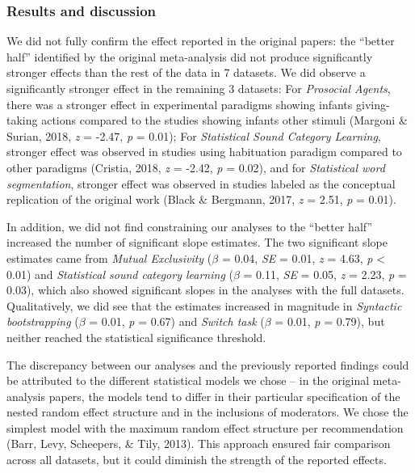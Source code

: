 \documentclass[
  man]{apa6}
\begin{document}
\hypertarget{results-and-discussion-2}{%
\subsubsection{Results and discussion}\label{results-and-discussion-2}}

We did not fully confirm the effect reported in the original papers: the ``better half'' identified by the original meta-analysis did not produce significantly stronger effects than the rest of the data in 7 datasets. We did observe a significantly stronger effect in the remaining 3 datasets: For \emph{Prosocial Agents}, there was a stronger effect in experimental paradigms showing infants giving-taking actions compared to the studies showing infants other stimuli (Margoni \& Surian, 2018, \emph{z} = -2.47, \emph{p} = 0.01); For \emph{Statistical Sound Category Learning}, stronger effect was observed in studies using habituation paradigm compared to other paradigms (Cristia, 2018, \emph{z} = -2.42, \emph{p} = 0.02), and for \emph{Statistical word segmentation}, stronger effect was observed in studies labeled as the conceptual replication of the original work (Black \& Bergmann, 2017, \emph{z} = 2.51, \emph{p} = 0.01).

In addition, we did not find constraining our analyses to the ``better half'' increased the number of significant slope estimates. The two significant slope estimates came from \emph{Mutual Exclusivity} (\(\beta\) = 0.04, \emph{SE} = 0.01, \emph{z} = 4.63, \emph{p} \textless{} 0.01) and \emph{Statistical sound category learning} (\(\beta\) = 0.11, \emph{SE} = 0.05, \emph{z} = 2.23, \emph{p} = 0.03), which also showed significant slopes in the analyses with the full datasets. Qualitatively, we did see that the estimates increased in magnitude in \emph{Syntactic bootstrapping} (\(\beta\) = 0.01, \emph{p} = 0.67) and \emph{Switch task} (\(\beta\) = 0.01, \emph{p} = 0.79), but neither reached the statistical significance threshold.

The discrepancy between our analyses and the previously reported findings could be attributed to the different statistical models we chose -- in the original meta-analysis papers, the models tend to differ in their particular specification of the nested random effect structure and in the inclusions of moderators. We chose the simplest model with the maximum random effect structure per recommendation (Barr, Levy, Scheepers, \& Tily, 2013). This approach ensured fair comparison across all datasets, but it could diminish the strength of the reported effects.
\end{document}

